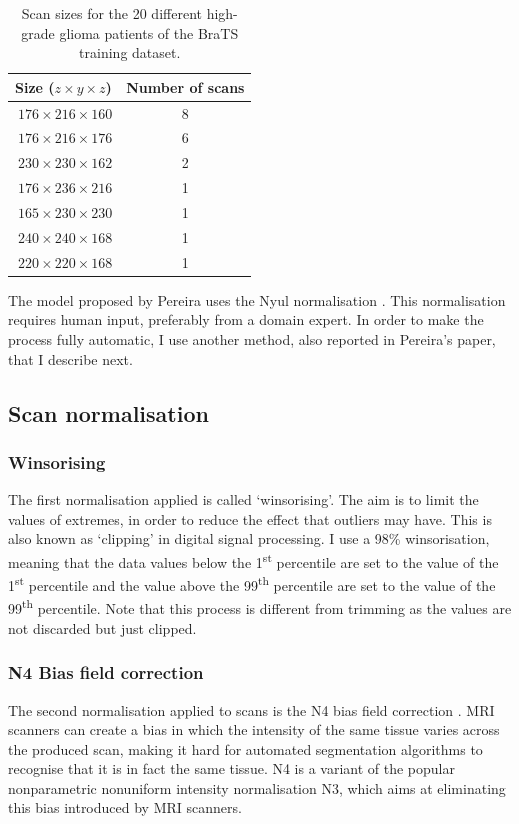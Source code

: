 \documentclass[12pt,a4paper,twoside,openright]{report}
\begin{document}
\begin{table}[h]
\centering	
\begin{tabular}{ m{3.5cm} c } 
\textbf{Size ($z \times y \times z$)} & \textbf{Number of scans}\\
 \hline
 $\ 176 \times 216 \times 160$ & 8 \\ 
 $\ 176 \times 216 \times 176$ & 6 \\ 
 $\ 230 \times 230 \times 162$ & 2 \\ 
 $\ 176 \times 236 \times 216$ & 1 \\ 
 $\ 165 \times 230 \times 230$ & 1 \\ 
 $\ 240 \times 240 \times 168$ & 1 \\ 
 $\ 220 \times 220 \times 168$ & 1 \\ 
\end{tabular}
\caption[Scan sizes for the 20 different patients of the training dataset.]{Scan sizes for the 20 different high-grade glioma patients of the BraTS training dataset.}
\label{table:scan_sizes}
\end{table}

The model proposed by Pereira\cite{pereira} uses the Nyul normalisation \cite{nyul}. This normalisation requires human input, preferably from a domain expert. In order to make the process fully automatic, I use another method, also reported in Pereira's paper, that I describe next.

\subsection{Scan normalisation}
\label{section:scan_normalisations}
\subsubsection{Winsorising}
The first normalisation applied is called `winsorising'. The aim is to limit the values of extremes, in order to reduce the effect that outliers may have. This is also known as `clipping' in digital signal processing. I use a 98\% winsorisation, meaning that the data values below the 1\textsuperscript{st} percentile are set to the value of the 1\textsuperscript{st} percentile and the value above the 99\textsuperscript{th} percentile are set to the value of the 99\textsuperscript{th} percentile. Note that this process is different from trimming as the values are not discarded but just clipped.

\subsubsection{N4 Bias field correction}
The second normalisation applied to scans is the N4 bias field correction \cite{n4itk}. MRI scanners can create a bias in which the intensity of the same tissue varies across the produced scan, making it hard for automated segmentation algorithms to recognise that it is in fact the same tissue. N4 is a variant of the popular nonparametric nonuniform intensity normalisation N3, which aims at eliminating this bias introduced by MRI scanners. 
\end{document}
